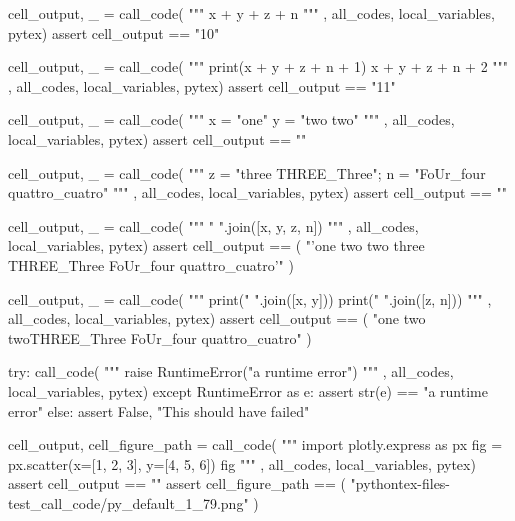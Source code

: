\documentclass{book}
\begin{document}
\begin{pycell}
cell_output, _ = call_code(
"""
x + y + z + n
"""
,
all_codes, local_variables, pytex)
assert cell_output == "10"
\end{pycell}

\begin{pycell}
cell_output, _ = call_code(
"""
print(x + y + z + n + 1)
x + y + z + n + 2
"""
,
all_codes, local_variables, pytex)
assert cell_output == "11"
\end{pycell}

\begin{pycell}
cell_output, _ = call_code(
"""
x = "one"
y = "two two"
"""
,
all_codes, local_variables, pytex)
assert cell_output == ""
\end{pycell}

\begin{pycell}
cell_output, _ = call_code(
"""
z = "three THREE_Three"; n = "FoUr_four quattro_cuatro"
"""
,
all_codes, local_variables, pytex)
assert cell_output == ""
\end{pycell}

\begin{pycell}
cell_output, _ = call_code(
"""
" ".join([x, y, z, n])
"""
,
all_codes, local_variables, pytex)
assert cell_output == (
    "'one two two three THREE_Three FoUr_four quattro_cuatro'"
)
\end{pycell}

\begin{pycell}
cell_output, _ = call_code(
"""
print(" ".join([x, y]))
print(" ".join([z, n]))
"""
,
all_codes, local_variables, pytex)
assert cell_output == (
    "one two two\nthree THREE_Three FoUr_four quattro_cuatro"
)
\end{pycell}

\begin{pycell}
try:
    call_code(
"""
raise RuntimeError("a runtime error")
"""
,
all_codes, local_variables, pytex)
except RuntimeError as e:
    assert str(e) == "a runtime error"
else:
    assert False, "This should have failed"
\end{pycell}

\begin{pycell}
cell_output, cell_figure_path = call_code(
"""
import plotly.express as px
fig = px.scatter(x=[1, 2, 3], y=[4, 5, 6])
fig
"""
,
all_codes, local_variables, pytex)
assert cell_output == ""
assert cell_figure_path == (
    "pythontex-files-test_call_code/py_default_1_79.png"
)
\end{pycell}
\end{document}
